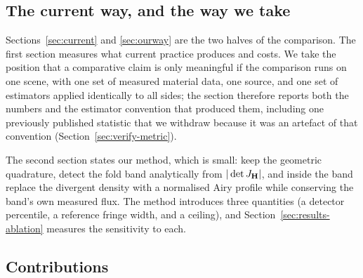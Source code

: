 \subsection{The current way, and the way we take}
\label{sec:why-current}

Sections~\ref{sec:current} and \ref{sec:ourway} are the two halves of the
comparison. The first section measures what current practice produces and costs. We
take the position that a comparative claim is only meaningful if the
comparison runs on one scene, with one set of measured material data, one
source, and one set of estimators applied identically to all sides; the section
therefore reports both the numbers and the estimator convention that produced
them, including one previously published statistic that we withdraw because it
was an artefact of that convention
(Section~\ref{sec:verify-metric}).

The second section states our method, which is small: keep the geometric
quadrature, detect the fold band analytically from $|\det J_{\mathbf{H}}|$, and inside the
band replace the divergent density with a normalised Airy profile while
conserving the band's own measured flux. The method introduces three
quantities (a detector percentile, a reference fringe width, and a ceiling),
and Section~\ref{sec:results-ablation} measures the sensitivity to each.

\subsection{Contributions}
\label{sec:contributions}

